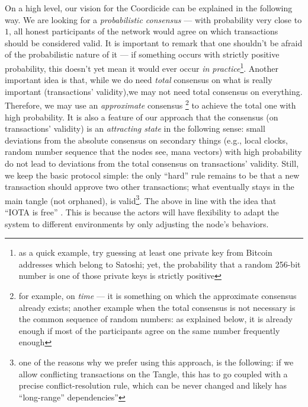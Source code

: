 \documentclass[../main.tex]{subfiles}
\begin{document}
On a high level, our vision for the Coordicide can be explained in the following way. 
We are looking for a \emph{probabilistic consensus} --- with probability very close to $1$, all honest participants of the network would agree on which transactions should be considered valid.
It is important to remark that one shouldn't be afraid of the probabilistic nature of it --- if something occurs with strictly
positive probability, this doesn't yet mean it would ever occur 
\emph{in practice}\footnote{as a quick example,
try guessing at least one private key from Bitcoin addresses which belong to Satoshi; yet, the probability that a random 256-bit number is
one of those private keys is strictly positive}.
Another important idea is that, while we do need \emph{total} consensus 
on what is really important (transactions' validity),we may not need total consensus on everything. Therefore, we may
use an \emph{approximate} consensus \footnote{for example, on \emph{time} 
--- it is something on which the approximate consensus already exists; another example when the total consensus is not necessary is the common sequence of random numbers: as explained below, it is already enough if most of the participants agree on the same number frequently enough} 
to achieve the total one with high probability. 
It is also a feature of our approach that the consensus (on transactions' validity) is an \emph{attracting state} in the following sense: small deviations from the absolute consensus on secondary things (e.g., local clocks, random number sequence that the nodes see, mana vectors) with high probability do not lead to deviations from the total consensus on transactions' validity. 
Still, we keep the basic protocol simple: the only ``hard'' rule remains to be that a new transaction should approve two other transactions; 
what eventually stays in the main tangle (not orphaned), 
is valid\footnote{one of the reasons why we prefer using this approach, 
is the following:
if we allow conflicting transactions on the Tangle, 
 this has to go coupled with a precise conflict-resolution rule, 
 which can be never changed and likely has ``long-range'' dependencies''}.
The above in line with the idea that ``IOTA is free'' \cite{popov2019feelessfree}. 
This is because the actors will have flexibility to adapt the system to different environments by only adjusting the node's behaviors.
\end{document}
